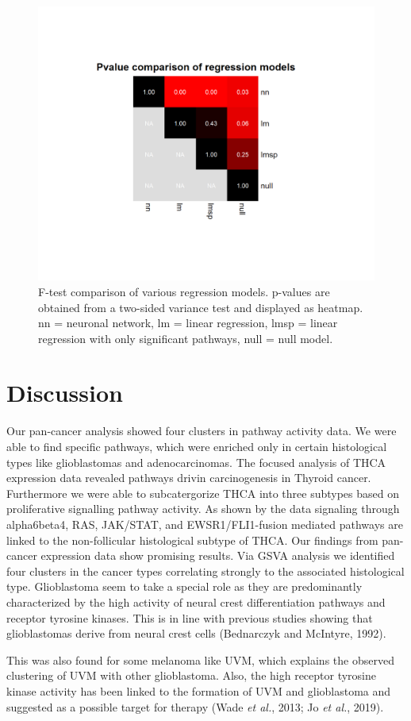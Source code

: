 \documentclass[
  parskip,
  oneside]{scrreprt}
\begin{document}
\begin{figure}

{\centering \includegraphics[width=0.3\linewidth]{figures/Regression comparison Pvalues IL36 genes} 

}

\caption{F-test comparison of various regression models. p-values are obtained from a two-sided variance test and displayed as heatmap. nn = neuronal network, lm = linear regression, lmsp = linear regression with only significant pathways, null = null model.}\label{fig:pval}
\end{figure}

\hypertarget{discussion}{%
\chapter{Discussion}\label{discussion}}

Our pan-cancer analysis showed four clusters in pathway activity data.
We were able to find specific pathways, which were enriched only in
certain histological types like glioblastomas and adenocarcinomas. The
focused analysis of THCA expression data revealed pathways drivin
carcinogenesis in Thyroid cancer. Furthermore we were able to
subcatergorize THCA into three subtypes based on proliferative
signalling pathway activity. As shown by the data signaling through
alpha6beta4, RAS, JAK/STAT, and EWSR1/FLI1-fusion mediated pathways are
linked to the non-follicular histological subtype of THCA. Our findings
from pan-cancer expression data show promising results. Via GSVA
analysis we identified four clusters in the cancer types correlating
strongly to the associated histological type. Glioblastoma seem to take
a special role as they are predominantly characterized by the high
activity of neural crest differentiation pathways and receptor tyrosine
kinases. This is in line with previous studies showing that
glioblastomas derive from neural crest cells (Bednarczyk and McIntyre,
1992).

This was also found for some melanoma like UVM, which explains the
observed clustering of UVM with other glioblastoma. Also, the high
receptor tyrosine kinase activity has been linked to the formation of
UVM and glioblastoma and suggested as a possible target for therapy
(Wade \emph{et al.}, 2013; Jo \emph{et al.}, 2019).
\end{document}
